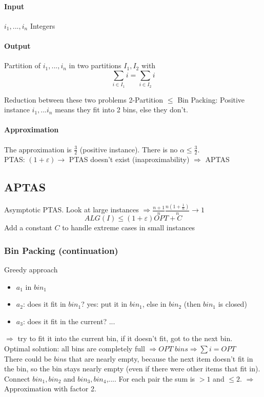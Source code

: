 \paragraph{Input} $i_1,...,i_n$ Integers
\paragraph{Output} Partition of $i_1,...,i_n$ in two partitions $I_1,I_2$ with $$\sum_{i \in I_1}i = \sum_{i \in I_2}i$$

Reduction between these two problems 2-Partition $\leq$ Bin Packing: Positive instance $i_1,...i_n$ means they fit into 2 bins, else they don't. 

\paragraph{Approximation}
The approximation is $\frac{3}{2}$ (positive instance). There is no $\alpha \leq \frac{3}{2}$. \\
PTAS: $(1+\varepsilon) \rightarrow$ PTAS doesn't exist (inaproximability) $\Rightarrow$  APTAS

\subsection{APTAS}
Asymptotic PTAS. Look at large instances $\Rightarrow \frac{n+1}{n} \frac{n (1+\frac{1}{n})}{n} \rightarrow 1$ \\ 
$$ALG(I) \leq (1+ \varepsilon)OPT + C$$
Add a constant $C$ to handle extreme cases in small instances

\subsubsection{Bin Packing (continuation)}
Greedy approach
\begin{itemize}
	\item $a_1$ in $bin_1$
	\item $a_2$: does it fit in $bin_1$? yes: put it in $bin_1$, else in $bin_2$ (then $bin_1$ is closed)
	\item $a_3$: does it fit in the current? ...
\end{itemize}
$\Rightarrow$ try to fit it into the current bin, if it doesn't fit, got to the next bin. \\ \newline 
Optimal solution: all bins are completely full $\Rightarrow OPT \; bins \Rightarrow \sum i = OPT$ \\
There could be $bin$s that are nearly empty, because the next item doesn't fit in the bin, so the bin stays nearly empty (even if there were other items that fit in). \\
Connect $bin_1,bin_2$ and $bin_3,bin_4$,.... For each pair the sum is $>1$ and $\leq 2$. $\Rightarrow$ Approximation with factor 2. \\ 
